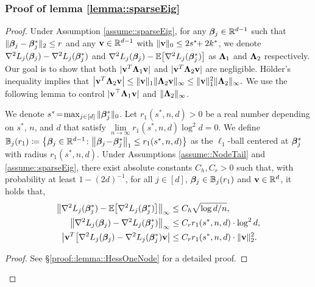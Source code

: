 \documentclass[twoside,11pt]{article}
\newcommand*{\BR}{\mathbb{R}}
\newcommand*{\hessstarss}{\nabla^2 {L_j}(\bbeta^*_{j})}
\newcommand*{\hessss}{\nabla^2  {L_j}(\bbeta_{j})}
\newcommand*{\bbetass}{\bbeta^*_{j}}
\newcommand*{\limn}{\lim \limits_{n\rightarrow \infty} }
\begin{document}
\subsubsection{Proof of lemma \ref{lemma::sparseEig}}\label{proof::lemma::sparseEig}
\begin{proof} 
Under Assumption \ref{assume::sparseEig}, for any  $ \bbeta_j\in \BR^{d-1} $ such that $\| \bbeta_j - \bbetass\|_2 \leq r$  and any $\vb\in \BR^{d-1}$ with $\| \mathbf{v}\|_ 0 \leq 2s^*\!\! + 2k^*$, we denote  $\nabla^2 L_j (\bm{\beta}_j) -  \nabla^2 L_j (\bm{\beta}_j^*)$ and  $\nabla^2 L_j (\bm{\beta}_j) - \mathbb{E}\bigl[ \nabla^2 L_j (\bm{\beta}_j^*)\bigr]$ as $\bm{\Lambda}_1 $ and $\bm{\Lambda}_2$ respectively. Our goal is to show that both $|\mathbf{v}^T \bm{\Lambda}_1 \mathbf{v}|$ and $|\mathbf{v}^T \bm{\Lambda}_2\mathbf{v}|$ are  negligible.
 H\"older's inequality implies that 
$
\bigl |\mathbf{v}^T \bm{\Lambda}_2\mathbf{v} \bigr | \leq \| \mathbf{v}\|_1\|  \bm{\Lambda}_2\mathbf{v}\| _\infty \leq \| \mathbf{v}\|_1 ^2 \| \bm{\Lambda}_2\| _\infty. 
$
We use the following lemma to control $| \mathbf{v}^\top \bm{\Lambda}_1 \mathbf{v} |$ and $ \| \bm{\Lambda}_2 \|_\infty$.
\begin{lemma}\label{lemma::HessOneNode}
We denote $s^* \!=\! \max _{j\in [d]}  \| \bbetass \|_0$. Let $r_1(s^*,n,d)>0$ be a real number depending on $s^*$, $n$, and $d$ that satisfy   $\limn r_1(s^*\!,n,d) \log^{2} d \!= \!0$.  We define  $\mathbb{B}_j(r_1) \coloneqq\bigl\{ \bbeta_j \in \BR^{d-1}\colon \bigl\| \bbeta_j \!-\! \bbetass \bigr \|_1 \leq  r_1(s^*,n,d) \bigr\} $ as the $\ell_1$-ball centered at $\bbetass$ with radius $r_1(s^*,n,d) $. 
Under Assumptions \ref{assume::NodeTail} and \ref{assume::sparseEig},  there exist  absolute  constants $C_h , C_r>0$ such that, with probability at least $1- (2d)^{-1}$, for all $j\in[d]$, $\bm{\beta}_j\in \mathbb{B}_j(r_1)$ and $\mathbf{v}\in \mathbb{R}^d$, it holds that, 
\begin{align}
 \bigl\| \hessstarss - \EE \bigl[\hessstarss\bigr]\bigr\|_\infty  &\leq C_h \sqrt{ \log d / n},\label{equ::lemmaPerturb1}\\
\bigl \| \hessss - \hessstarss \bigr \|_\infty &\leq C_{r} r_1(s^*,n,d) \cdot \log^2 d, \label{equ::lemmaPerturb2}\\
\bigl| \vb^T\bigl[\hessss - \hessstarss\vb\bigr| & \leq C_{r} r_1(s^*,n,d) \cdot \| \vb\|_2^2.\label{equ::lemmaPerturb3}
\end{align}  
\end{lemma}

\begin{proof} 
See \S \ref{proof::lemma::HessOneNode} for a detailed proof.
\end{proof}


\end{proof}
\end{document}
